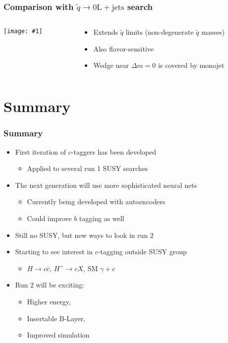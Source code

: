 \documentclass[usenames,dvipsnames]{beamer}
\newcommand{\widegraphic}[1]{\texttt{[image: \#1]}}
\begin{document}
\begin{frame}
  \frametitle{Comparison with $\tilde{q} \to \mathrm{0L} + \text{jets}$ search}
  \begin{columns}
    \begin{column}{0.6\textwidth}
      \widegraphic{int/figures/limit_tree/full_exclusion/exclusion_inclusive.pdf}
    \end{column}
    \begin{column}{0.4\textwidth}
      \begin{itemize}
      \item Extends $\tilde{q}$ limits (non-degenerate $\tilde{q}$ masses)
      \item Also flavor-sensitive
      \item Wedge near $\Delta m = 0$ is covered by monojet
      \end{itemize}
    \end{column}
  \end{columns}
\end{frame}

\section{Summary}

\begin{frame}
  \frametitle{Summary}
  \begin{itemize}
  \item First iteration of $c$-taggers has been developed
    \begin{itemize}
    \item Applied to several run 1 SUSY searches
    \end{itemize}
  \item The next generation will use more sophisticated neural nets
    \begin{itemize}
    \item Currently being developed with autoencoders
    \item Could improve $b$ tagging as well
    \end{itemize}
  \item Still no SUSY, but new ways to look in run 2
  \item Starting to see interest in $c$-tagging outside SUSY group
    \begin{itemize}
      \item $H \to c\bar{c}$, $H^{+} \to cX$, SM $\gamma + c$
    \end{itemize}
  \item Run 2 will be exciting:
    \begin{itemize}
      \item Higher energy,
      \item Insertable B-Layer,
      \item Improved simulation
    \end{itemize}
  \end{itemize}
\end{frame}
\end{document}
